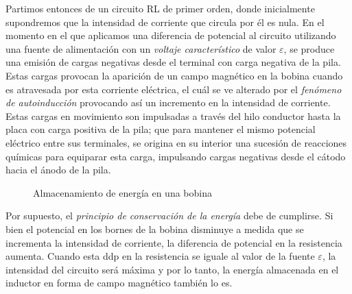 \documentclass[../main.tex]{subfiles}
\begin{document}
Partimos entonces de un circuito RL de primer orden, donde inicialmente supondremos que la intensidad de corriente que circula por él es nula. En el momento en el que aplicamos una diferencia de potencial al circuito utilizando una fuente de alimentación con un \textit{voltaje característico} de valor $\varepsilon$, se produce una emisión de cargas negativas desde el terminal con carga negativa de la pila. Estas cargas provocan la aparición de un campo magnético en la bobina cuando es atravesada por esta corriente eléctrica, el cuál se ve alterado por el \textit{fenómeno de autoinducción} provocando así un incremento en la intensidad de corriente. Estas cargas en movimiento son impulsadas a través del hilo conductor hasta la placa con carga positiva de la pila; que para mantener el mismo potencial eléctrico entre sus terminales, se origina en su interior una sucesión de reacciones químicas para equiparar esta carga, impulsando cargas negativas desde el cátodo hacia el ánodo de la pila.

\begin{figure}[!h]
    \centering
    \caption{Almacenamiento de energía en una bobina}
    \label{fig::carga_bobina}
\end{figure}

Por supuesto, el \textit{principio de conservación de la energía} debe de cumplirse. Si bien el potencial en los bornes de la bobina disminuye a medida que se incrementa la intensidad de corriente, la diferencia de potencial en la resistencia aumenta. Cuando esta ddp en la resistencia se iguale al valor de la fuente $\varepsilon$, la intensidad del circuito será máxima y por lo tanto, la energía almacenada en el inductor en forma de campo magnético también lo es.
\end{document}
